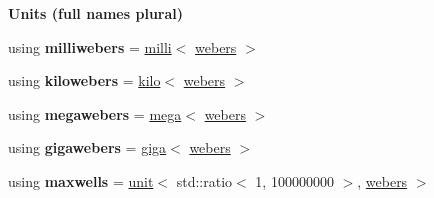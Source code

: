 \begin{Indent}{\bf Units (full names plural)}
\begin{DoxyCompactItemize}
\item 
\hypertarget{namespaceunits_1_1magnetic__flux_a1e5b7bf956e840e3c5a1e0abe7485d3e}{}using {\bfseries milliwebers} = \hyperlink{group___unit_manipulators_gaec9d1c320e180eb59f3cb3094d8079dd}{milli}$<$ \hyperlink{structunits_1_1unit}{webers} $>$\label{namespaceunits_1_1magnetic__flux_a1e5b7bf956e840e3c5a1e0abe7485d3e}

\item 
\hypertarget{namespaceunits_1_1magnetic__flux_a16c69cdd99683fe756ed1f127b37527e}{}using {\bfseries kilowebers} = \hyperlink{group___unit_manipulators_ga89965a45aaa6689548b9c53858759c5e}{kilo}$<$ \hyperlink{structunits_1_1unit}{webers} $>$\label{namespaceunits_1_1magnetic__flux_a16c69cdd99683fe756ed1f127b37527e}

\item 
\hypertarget{namespaceunits_1_1magnetic__flux_a4b5db29c935f3f3a3283fcd4f1bddc32}{}using {\bfseries megawebers} = \hyperlink{group___unit_manipulators_gab1e685fcf4dd9478ed3d688f7af50842}{mega}$<$ \hyperlink{structunits_1_1unit}{webers} $>$\label{namespaceunits_1_1magnetic__flux_a4b5db29c935f3f3a3283fcd4f1bddc32}

\item 
\hypertarget{namespaceunits_1_1magnetic__flux_a0f31c01091fe7c6ca07b9e279fab1a29}{}using {\bfseries gigawebers} = \hyperlink{group___unit_manipulators_ga4595911f659ef61133216da15d61eb07}{giga}$<$ \hyperlink{structunits_1_1unit}{webers} $>$\label{namespaceunits_1_1magnetic__flux_a0f31c01091fe7c6ca07b9e279fab1a29}

\item 
\hypertarget{namespaceunits_1_1magnetic__flux_a3fe3093aadb7576684843456597e3870}{}using {\bfseries maxwells} = \hyperlink{structunits_1_1unit}{unit}$<$ std\+::ratio$<$ 1, 100000000 $>$, \hyperlink{structunits_1_1unit}{webers} $>$\label{namespaceunits_1_1magnetic__flux_a3fe3093aadb7576684843456597e3870}

\end{DoxyCompactItemize}
\end{Indent}
